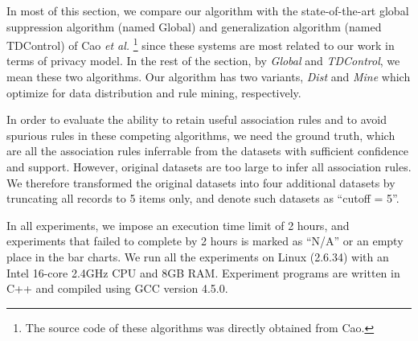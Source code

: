
In most of this section, we compare our algorithm with the
state-of-the-art global suppression
algorithm (named Global) and generalization algorithm (named TDControl) of
Cao {\em et al.} \cite{Cao:2010:rho}\footnote{The source code of these
algorithms was directly obtained from Cao.} since these systems are most
related to our work in terms of privacy model. In the rest of the section,
by {\em Global} and {\em TDControl}, we mean these two algorithms.
Our algorithm has two variants, {\em Dist} and {\em Mine} which optimize
for data distribution and rule mining, respectively.


In order to evaluate the ability to retain useful association rules and
to avoid spurious rules in these competing algorithms, we need the ground
truth, which are all the association rules inferrable from the datasets with
sufficient confidence and support.
However, original datasets are too large to infer all association rules.
We therefore transformed the original datasets into four
additional datasets by truncating all records to 5 items only, and denote
such datasets as ``cutoff = 5''.

In all experiments, we impose an execution time limit of
2 hours, and experiments that failed to complete by 2 hours is marked
as ``N/A'' or an empty place in the bar charts.
We run all the experiments on Linux (2.6.34) with an Intel 16-core 2.4GHz CPU
and 8GB RAM. Experiment programs are written in C++ and compiled using GCC
version 4.5.0.


